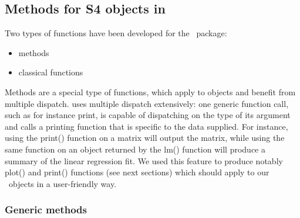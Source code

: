 \subsection{Methods for S4 objects in \saemix}

Two types of functions have been developed for the \saemix~package:
\begin{itemize}
\item methods
\item classical functions
\end{itemize}
Methods are a special type of functions, which apply to objects and benefit from multiple dispatch. \R uses multiple dispatch extensively: one generic function call, such as for instance {\sf print}, is capable of dispatching on the type of its argument and calls a printing function that is specific to the data supplied. For instance, using the {\sf print()} function on a matrix will output the matrix, while using the same function on an object returned by the {\sf lm()} function will produce a summary of the linear regression fit. We used this feature to produce notably {\sf plot()} and {\sf print()} functions (see next sections) which should apply to our \saemix~objects in a user-friendly way.

\subsubsection{Generic methods}

